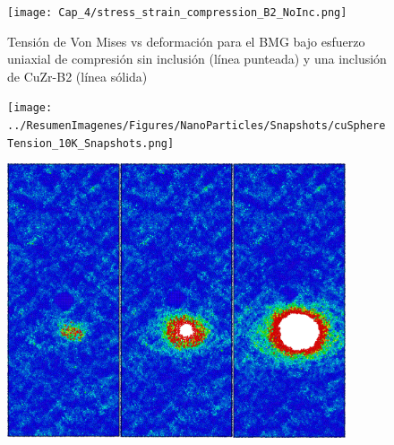 \begin{figure}[htp]
\centering
\texttt{[image: Cap\_4/stress\_strain\_compression\_B2\_NoInc.png]}
\caption[Von Mises vs deformación en compresión. Inclusión de CuZr-B2]{Tensión de Von Mises vs deformación para el BMG bajo esfuerzo uniaxial de compresión sin inclusión (línea punteada) y una inclusión de CuZr-B2 (línea sólida)}
\label{C4:fg:b2_vm_compression}
\end{figure}

\begin{figure}[htp]
\centering
\texttt{[image: ../ResumenImagenes/Figures/NanoParticles/Snapshots/cuSphereTension\_10K\_Snapshots.png]}
\caption[Inclusión de Cu-FCC bajo tracción a 10K]{}
\label{C4:fg:snapshot_ten_FCC_10K}
\end{figure}

% 

\begin{figure}[htp]
\centering
\includegraphics[width=10cm]{../ResumenImagenes/Figures/NanoParticles/Snapshots/cuSphereTension_200K_Snapshots.png}
\caption[Inclusión de Cu-FCC bajo tracción a 200K]{}
\label{C4:fg:snapshot_ten_FCC_200K}
\end{figure}

